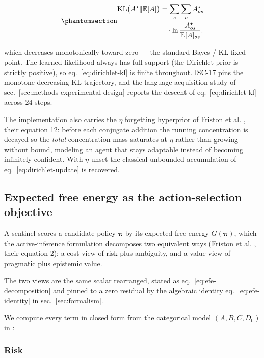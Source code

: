 \documentclass[
  english,
]{article}
\theoremstyle{plain}
\theoremstyle{definition}
\theoremstyle{remark}
\theoremstyle{definition}
\begin{document}
\begin{equation}\protect\phantomsection\label{eq:dirichlet-kl}{\begin{aligned}
\mathrm{KL}\big(A^{\star}\|\mathbb{E}[A]\big)
&= \sum_s\sum_o A^{\star}_{os}\\
&\quad\cdot\ln\frac{A^{\star}_{os}}{\mathbb{E}[A]_{os}}.
\end{aligned}}\end{equation}

which decreases monotonically toward zero --- the standard-Bayes / KL
fixed point. The learned likelihood always has full support (the
Dirichlet prior is strictly positive), so eq.~\ref{eq:dirichlet-kl} is
finite throughout. ISC-17 pins the monotone-decreasing KL trajectory,
and the language-acquisition study of
sec.~\ref{sec:methods-experimental-design} reports the descent of
eq.~\ref{eq:dirichlet-kl} across 24 steps.

The implementation also carries the \(\eta\) forgetting hyperprior of
Friston et al. \citeyearpar{friston2024federated}, their equation 12:
before each conjugate addition the running concentration is decayed so
the \emph{total} concentration mass saturates at \(\eta\) rather than
growing without bound, modeling an agent that stays adaptable instead of
becoming infinitely confident. With \(\eta\) unset the classical
unbounded accumulation of eq.~\ref{eq:dirichlet-update} is recovered.

\subsection{Expected free energy as the action-selection
objective}\label{sec:methods-efe}

A sentinel scores a candidate policy \(\boldsymbol{\pi}\) by its
expected free energy \(G(\boldsymbol{\pi})\), which the active-inference
formulation decomposes two equivalent ways (Friston et al.
\citeyearpar{friston2024federated}, their equation 2): a cost view of
risk plus ambiguity, and a value view of pragmatic plus epistemic value.

The two views are the same scalar rearranged, stated as
eq.~\ref{eq:efe-decomposition} and pinned to a zero residual by the
algebraic identity eq.~\ref{eq:efe-identity} in
sec.~\ref{sec:formalism}.

We compute every term in closed form from the categorical model
\((A, B, C, D_0)\) in :

\subsubsection{Risk}\label{risk}
\end{document}

